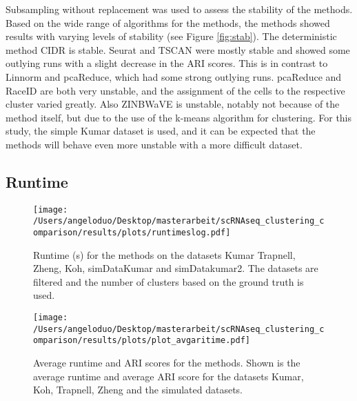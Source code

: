 \documentclass[12pt, a4paper]{article}\usepackage[]{graphicx}\usepackage[]{color}
\begin{document}
Subsampling without replacement was used to assess the stability of the methods. Based on the wide range of algorithms for the methods, the methods showed results with varying levels of stability (see Figure \ref{fig:stab}). The deterministic method CIDR is stable. Seurat and TSCAN were mostly stable and showed some outlying runs with a slight decrease in the ARI scores. This is in contrast to Linnorm and pcaReduce, which had some strong outlying runs. pcaReduce and RaceID are both very unstable, and the assignment of the cells to the respective cluster varied greatly. Also  ZINBWaVE is unstable, notably not because of the method itself, but  due to the use of the k-means algorithm for clustering. For this study, the simple Kumar dataset is used, and it can be expected that the methods will behave even more unstable with a more difficult dataset.

 
\newpage

\subsection{Runtime} 

\begin{figure}[htp]
\begin{center}
\texttt{[image: /Users/angeloduo/Desktop/masterarbeit/scRNAseq\_clustering\_comparison/results/plots/runtimeslog.pdf]}
\caption{Runtime (s) for the methods on the datasets Kumar Trapnell, Zheng, Koh, simDataKumar and simDatakumar2. The datasets are filtered and the number of clusters based on the ground truth is used.}
\label{fig:runtimelog}
\end{center}
\end{figure}


\begin{figure}[htp]
\begin{center}
\texttt{[image: /Users/angeloduo/Desktop/masterarbeit/scRNAseq\_clustering\_comparison/results/plots/plot\_avgaritime.pdf]}
\caption{Average runtime and ARI scores for the methods. Shown is the average runtime and average ARI score for the datasets Kumar, Koh, Trapnell, Zheng and the simulated datasets.}
\label{fig:avgtimeari}
\end{center}
\end{figure}
\end{document}

